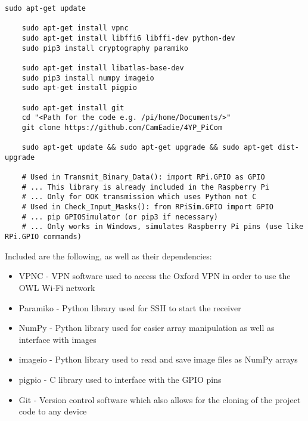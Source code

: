 \documentclass[../main.tex]{subfiles}
\begin{document}
\lstset{style=python}
\begin{lstlisting}[caption=Libraries and Packages Required for the Test Bed]
	sudo apt-get update
	
	sudo apt-get install vpnc
	sudo apt-get install libffi6 libffi-dev python-dev
	sudo pip3 install cryptography paramiko
	
	sudo apt-get install libatlas-base-dev
	sudo pip3 install numpy imageio
	sudo apt-get install pigpio
	
	sudo apt-get install git
	cd "<Path for the code e.g. /pi/home/Documents/>"
	git clone https://github.com/CamEadie/4YP_PiCom

	sudo apt-get update && sudo apt-get upgrade && sudo apt-get dist-upgrade

	# Used in Transmit_Binary_Data(): import RPi.GPIO as GPIO
	# ... This library is already included in the Raspberry Pi
	# ... Only for OOK transmission which uses Python not C
	# Used in Check_Input_Masks(): from RPiSim.GPIO import GPIO
	# ... pip GPIOSimulator (or pip3 if necessary)
	# ... Only works in Windows, simulates Raspberry Pi pins (use like RPi.GPIO commands)
\end{lstlisting}

Included are the following, as well as their dependencies:

\begin{itemize}
	\item VPNC - VPN software used to access the Oxford VPN in order to use the OWL Wi-Fi network
	\item Paramiko - Python library used for SSH to start the receiver
	\item NumPy - Python library used for easier array manipulation as well as interface with images
	\item imageio - Python library used to read and save image files as NumPy arrays
	\item pigpio - C library used to interface with the GPIO pins
	\item Git - Version control software which also allows for the cloning of the project code to any device
\end{itemize}

\clearpage
\end{document}
